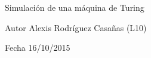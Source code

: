Simulación de una máquina de Turing \begin{DoxyAuthor}{Autor}
Alexis Rodríguez Casañas (L10) 
\end{DoxyAuthor}
\begin{DoxyDate}{Fecha}
16/10/2015 
\end{DoxyDate}
